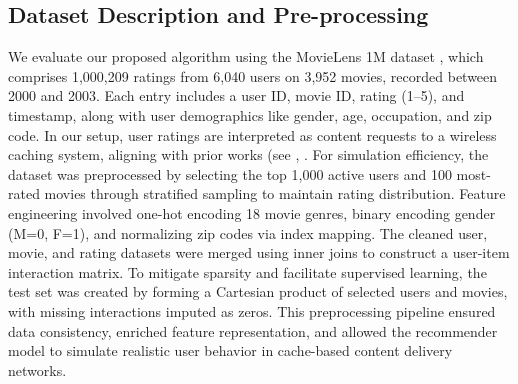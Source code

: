 \documentclass[journal]{IEEEtran}
\begin{document}
\subsection{Dataset Description and Pre-processing}
We evaluate our proposed algorithm using the MovieLens 1M dataset \cite{harper2015movielens}, which comprises 1,000,209 ratings from 6,040 users on 3,952 movies, recorded between 2000 and 2003. Each entry includes a user ID, movie ID, rating (1–5), and timestamp, along with user demographics like gender, age, occupation, and zip code. In our setup, user ratings are interpreted as content requests to a wireless caching system, aligning with prior works (see \cite{li2016trend}, \cite{zhu2018deep}. For simulation efficiency, the dataset was preprocessed by selecting the top 1,000 active users and 100 most-rated movies through stratified sampling to maintain rating distribution. Feature engineering involved one-hot encoding 18 movie genres, binary encoding gender (M=0, F=1), and normalizing zip codes via index mapping. The cleaned user, movie, and rating datasets were merged using inner joins to construct a user-item interaction matrix. To mitigate sparsity and facilitate supervised learning, the test set was created by forming a Cartesian product of selected users and movies, with missing interactions imputed as zeros. This preprocessing pipeline ensured data consistency, enriched feature representation, and allowed the recommender model to simulate realistic user behavior in cache-based content delivery networks.
\end{document}

